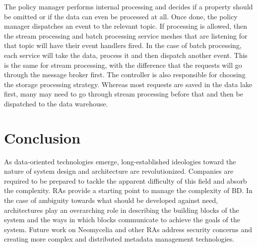 \documentclass[runningheads]{llncs}
\begin{document}
The policy manager performs internal processing and decides if a property should be omitted or if the data can even be processed at all. Once done, the policy manager dispatches an event to the relevant topic. If processing is allowed, then the stream processing and batch processing service meshes that are listening for that topic will have their event handlers fired. In the case of batch processing, each service will take the data, process it and then dispatch another event. This is the same for stream processing, with the difference that the requests will go through the message broker first. The controller is also responsible for choosing the storage processing strategy. Whereas most requests are saved in the data lake first, many may need to go through stream processing before that and then be dispatched to the data warehouse.

\section{Conclusion}

As data-oriented technologies emerge, long-established ideologies toward the nature of system design and architecture are revolutionized. Companies are required to be prepared to tackle the apparent difficulty of this field and absorb the complexity. RAs provide a starting point to manage the complexity of BD. In the case of ambiguity towards what should be developed against need, architectures play an overarching role in describing the building blocks of the system and the ways in which blocks communicate to achieve the goals of the system. Future work on Neomycelia and other RAs address security concerns and creating more complex and distributed metadata management technologies.



\end{document}
